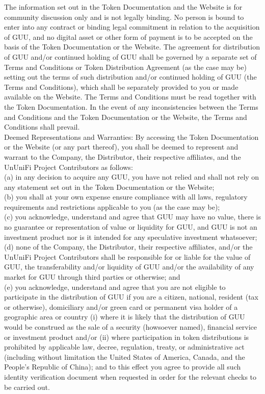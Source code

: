 \documentclass[dvipdfmx]{jsarticle}
\begin{document}
The information set out in the Token Documentation and the Website is for community discussion only and is not legally binding. No person is bound to enter into any contract or binding legal commitment in relation to the acquisition of GUU, and no digital asset or other form of payment is to be accepted on the basis of the Token Documentation or the Website. The agreement for distribution of GUU and/or continued holding of GUU shall be governed by a separate set of Terms and Conditions or Token Distribution Agreement (as the case may be) setting out the terms of such distribution and/or continued holding of GUU (the Terms and Conditions), which shall be separately provided to you or made available on the Website. The Terms and Conditions must be read together with the Token Documentation. In the event of any inconsistencies between the Terms and Conditions and the Token Documentation or the Website, the Terms and Conditions shall prevail.\\
Deemed Representations and Warranties: By accessing the Token Documentation or the Website (or any part thereof), you shall be deemed to represent and warrant to the Company, the Distributor, their respective affiliates, and the UnUniFi Project Contributors as follows:\\
(a)	in any decision to acquire any GUU, you have not relied and shall not rely on any statement set out in the Token Documentation or the Website;\\
(b)	you shall at your own expense ensure compliance with all laws, regulatory requirements and restrictions applicable to you (as the case may be);\\
(c)	you acknowledge, understand and agree that GUU may have no value, there is no guarantee or representation of value or liquidity for GUU, and GUU is not an investment product nor is it intended for any speculative investment whatsoever;\\
(d)	none of the Company, the Distributor, their respective affiliates, and/or the UnUniFi Project Contributors shall be responsible for or liable for the value of GUU, the transferability and/or liquidity of GUU and/or the availability of any market for GUU through third parties or otherwise; and\\
(e)	you acknowledge, understand and agree that you are not eligible to participate in the distribution of GUU if you are a citizen, national, resident (tax or otherwise), domiciliary and/or green card or permanent visa holder of a geographic area or country (i) where it is likely that the distribution of GUU would be construed as the sale of a security (howsoever named), financial service or investment product and/or (ii) where participation in token distributions is prohibited by applicable law, decree, regulation, treaty, or administrative act (including without limitation the United States of America, Canada, and the People's Republic of China); and to this effect you agree to provide all such identity verification document when requested in order for the relevant checks to be carried out.\\
\end{document}
